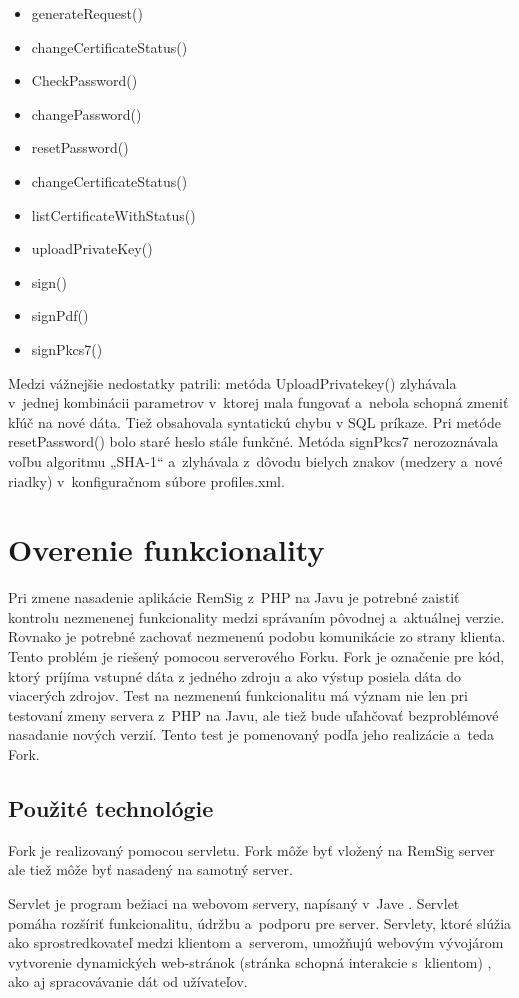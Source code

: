\documentclass[
  digital, %
  table,   %
oneside,
  nolof,     %
  nolot,     %
]{fithesis3}
\begin{document}
\begin{itemize}

\item generateRequest()
\item changeCertificateStatus()
\item CheckPassword()
\item changePassword()
\item resetPassword()
\item changeCertificateStatus()
\item listCertificateWithStatus()
\item uploadPrivateKey()
\item sign()
\item signPdf()
\item signPkcs7()
 \end{itemize}


Medzi vážnejšie nedostatky patrili: metóda UploadPrivatekey() zlyhávala v~jednej kombinácii parametrov v~ktorej mala fungovať a~nebola schopná zmeniť kľúč na nové dáta. Tiež obsahovala syntatickú chybu v SQL príkaze. Pri metóde resetPassword() bolo staré heslo stále funkčné. Metóda signPkcs7 nerozoznávala voľbu algoritmu „SHA-1“ a~zlyhávala z~dôvodu bielych znakov (medzery a~nové riadky) v~konfiguračnom súbore profiles.xml. 



\section{Overenie funkcionality}
Pri zmene nasadenie aplikácie RemSig z~PHP na Javu je potrebné zaistiť kontrolu nezmenenej funkcionality medzi správaním pôvodnej a~aktuálnej verzie. Rovnako je potrebné zachovať nezmenenú podobu komunikácie zo strany klienta. Tento problém je riešený pomocou serverového Forku. Fork je označenie pre kód, ktorý príjíma vstupné dáta z jedného zdroju a ako výstup posiela dáta do viacerých zdrojov. Test na nezmenenú funkcionalitu má význam nie len pri testovaní zmeny servera z~PHP na Javu, ale tiež bude uľahčovať bezproblémové nasadanie nových verzií. Tento test je pomenovaný podľa jeho realizácie a~teda Fork. 
\subsection{Použité technológie}
Fork je realizovaný pomocou servletu. Fork môže byť vložený na RemSig server ale tiež môže byť nasadený na samotný server.

Servlet je program bežiaci na webovom servery, napísaný v~Jave \cite{servlet}. Servlet pomáha rozšíriť  funkcionalitu, údržbu a~podporu pre server. Servlety, ktoré slúžia ako sprostredkovateľ medzi klientom a~serverom,  umožňujú webovým vývojárom vytvorenie dynamických web-stránok (stránka schopná interakcie s~klientom) \cite{staticVsDynamic}, ako aj spracovávanie dát od užívateľov. 
\end{document}
